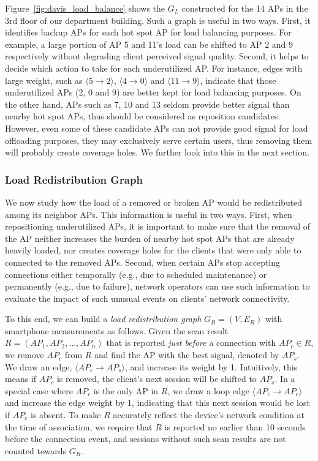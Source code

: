 Figure~\ref{fig:davis_load_balance} shows the $G_L$ constructed for the 14 APs
in the 3rd floor of our department building. Such a graph is useful in two ways. First, it
identifies backup APs for each hot spot AP for load balancing purposes. For
example, a large portion of AP 5 and 11's load can be shifted to AP 2 and 9
respectively without degrading client perceived signal quality. Second, it helps
to decide which action to take for each underutilized AP. For instance, edges
with large weight, such as $\langle 5 \rightarrow 2 \rangle$, $\langle 4
\rightarrow 0 \rangle$ and $\langle 11 \rightarrow 9 \rangle$, indicate that
those underutilized APs (2, 0 and 9) are better kept for load balancing
purposes. On the other hand, APs such as 7, 10 and 13 seldom provide better
signal than nearby hot spot APs, thus should be considered as reposition
candidates. However, even some of these candidate APs can not provide good
signal for load offloading purposes, they may exclusively serve certain users,
thus removing them will probably create coverage holes. We further look into
this in the next section.


\subsubsection{Load Redistribution Graph}
\label{subsec:load_redist}

We now study how the load of a removed or broken AP would be
redistributed among its neighbor APs. This information is useful in two ways.
First, when repositioning underutilized APs, it is important to make sure that
the removal of the AP neither increases the burden of nearby hot spot APs
that are already heavily loaded, nor creates coverage holes for the clients that
were only able to connected to the removed APs. Second, when certain APs stop
accepting connections either temporally (e.g., due to scheduled maintenance) or
permanently (e.g., due to failure), network operators can use such information
to evaluate the impact of such unusual events on clients' network connectivity.

To this end, we can build a \textit{load redistribution graph} $G_R=(V, E_R)$ with
smartphone measurements as follows. Given the \wifi{}
scan result $R=(AP_1, AP_2,\ldots, AP_n)$ that is reported \textit{just before}
a \wifi{} connection with $AP_c \in R$, we remove $AP_c$ from $R$ and find the
AP with the best signal, denoted by $AP_s$. We draw an edge, $\langle AP_c
\rightarrow AP_s \rangle$, and increase its weight by 1. Intuitively, this
means if $AP_c$ is removed, the client's next \wifi{} session will be shifted to
$AP_s$. In a special case where $AP_c$ is the only AP in $R$, we draw a loop
edge $\langle AP_c \rightarrow AP_c \rangle$ and increase the edge weight by 1,
indicating that this next session would be lost if $AP_c$ is absent. To make
$R$ accurately reflect the device's network condition at the time of
association, we require that $R$ is reported no earlier than 10 seconds before the
connection event, and \wifi{} sessions without such scan results are not counted
towards $G_R$.


